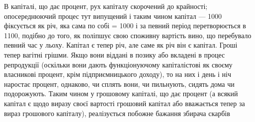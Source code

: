 В капіталі, що дає процент, рух капіталу скорочений до
крайності; опосереднюючий процес тут випущений і таким чином
капітал — 1000 фіксується як річ, яка сама по собі = 1000 і за певний
період перетворюється в 1100, подібно до того, як поліпшує
свою споживну вартість вино, що перебувало певний час у льоху.
Капітал є тепер річ, але саме як річ він є капітал. Гроші тепер
вагітні грішми. Якщо вони віддані в позику або вкладені в процес
репродукції (оскільки вони дають функціонуючому капіталістові
як своєму власникові процент, крім підприємницького доходу), то
на них і день і ніч наростає процент, однаково, чи сплять вони,
чи пильнують, сидять дома чи подорожують. Таким чином у
грошовому капіталі, що дає процент (а всякий капітал є щодо виразу
своєї вартості грошовий капітал або вважається тепер
за вираз грошового капіталу), реалізується побожне бажання збирача
скарбів
